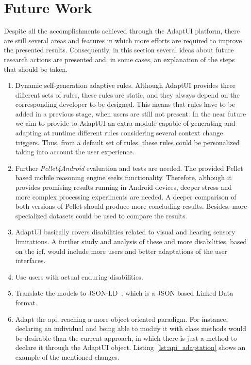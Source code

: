\section{Future Work}
\label{sec:future_work}

Despite all the accomplishments achieved through the AdaptUI platform, there are 
still several areas and features in which more efforts are required to improve 
the presented results. Consequently, in this section several ideas about future
research actions are presented and, in some cases, an explanation of the steps 
that should be taken.

\begin{enumerate}[label=\alph*)]
  \item Dynamic self-generation adaptive rules. Although AdaptUI provides three 
  different sets of rules, these rules are static, and they always depend on 
  the corresponding developer to be designed. This means that rules have to 
  be added in a previous stage, when users are still not present. In the near 
  future we aim to provide to AdaptUI an extra module capable of generating and 
  adapting at runtime different rules considering several context change 
  triggers. Thus, from a default set of rules, these rules could be personalized 
  taking into account the user experience.
  
  \item Further \textit{Pellet4Android} evaluation and tests are needed. The
  provided Pellet based mobile reasoning engine seeks functionality. Therefore,
  although it provides promising results running in Android devices, deeper 
  stress and  more complex processing experiments are needed. A deeper comparison
  of both versions of Pellet should produce more concluding results. Besides, more
  specialized datasets could be used to compare the results.
  
  \item AdaptUI basically covers disabilities related to visual and hearing
  sensory limitations. A further study and analysis of these and more 
  disabilities, based on the \ac{icf}, would include more users and better 
  adaptations of the user interfaces.
  
  \item Use users with actual enduring disabilities.
  
  \item Translate the models to JSON-LD~\citep{jsonld}, which is a JSON based
  Linked Data format.
  
  \item Adapt the \ac{api}, reaching a more object oriented paradigm. For instance,
  declaring an individual and being able to modify it with class methods would 
  be desirable than the current approach, in which there is just a method to
  declare it through the AdaptUI object. Listing~\ref{lst:api_adaptation} shows
  an example of the mentioned changes.
  

\end{enumerate}
